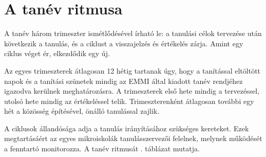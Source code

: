 \section{A tanév ritmusa}
\label{sec:tanev_ritmusa}
A tanév három trimeszter ismétlődésével írható le: a tanulási célok tervezése után következik a tanulás, és a ciklust a visszajelzés és értékelés zárja.	Amint egy ciklus véget ér, elkezdődik egy új.


Az egyes trimeszterek átlagosan 12 hétig tartanak úgy, hogy a tanítással eltöltött napok  és a tanítási szünetek mindig az EMMI által kiadott tanév rendjéhez igazodva kerülnek meghatározásra. A trimeszterek első hete mindig a tervezéssel, utolsó hete mindig az értékeléssel telik. Trimeszterenként átlagosan további egy hét a közösség építésével, önálló tanulással  zajlik.

A ciklusok állandósága adja a tanulás irányításához szükséges kereteket. Ezek megtartásáért az egyes mikroiskolák tanulásszervezői felelnek, melynek működését a fenntartó monitorozza. A tanév ritmusát . táblázat mutatja.


